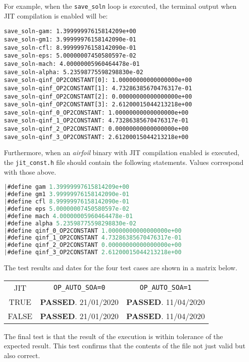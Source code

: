 \clearpage
\noindent For example, when the \verb|save_soln| loop is executed, the terminal output when JIT compilation is enabled will be:
\begin{lstlisting}[frame=none]
save_soln-gam: 1.39999997615814209e+00
save_soln-gm1: 3.99999976158142090e-01
save_soln-cfl: 8.99999976158142090e-01
save_soln-eps: 5.00000007450580597e-02
save_soln-mach: 4.00000005960464478e-01
save_soln-alpha: 5.23598775598298830e-02
save_soln-qinf_OP2CONSTANT[0]: 1.00000000000000000e+00
save_soln-qinf_OP2CONSTANT[1]: 4.73286385670476317e-01
save_soln-qinf_OP2CONSTANT[2]: 0.00000000000000000e+00
save_soln-qinf_OP2CONSTANT[3]: 2.61200015044213218e+00
save_soln-qinf_0_OP2CONSTANT: 1.00000000000000000e+00
save_soln-qinf_1_OP2CONSTANT: 4.73286385670476317e-01
save_soln-qinf_2_OP2CONSTANT: 0.00000000000000000e+00
save_soln-qinf_3_OP2CONSTANT: 2.61200015044213218e+00
\end{lstlisting}

\noindent Furthermore, when an \textit{airfoil} binary with JIT compilation enabled is executed, the \verb|jit_const.h| file should contain the following statements. Values correspond with those above.
\begin{lstlisting}[backgroundcolor=\color{green!20}, language=C]
|#define gam 1.39999997615814209e+00
|#define gm1 3.99999976158142090e-01
|#define cfl 8.99999976158142090e-01
|#define eps 5.00000007450580597e-02
|#define mach 4.00000005960464478e-01
|#define alpha 5.23598775598298830e-02
|#define qinf_0_OP2CONSTANT 1.00000000000000000e+00
|#define qinf_1_OP2CONSTANT 4.73286385670476317e-01
|#define qinf_2_OP2CONSTANT 0.00000000000000000e+00
|#define qinf_3_OP2CONSTANT 2.61200015044213218e+00
\end{lstlisting}
\vfill
\noindent The test results and dates for the four test cases are shown in a matrix below.
\begin{table}[h]
\centering
\renewcommand{\arraystretch}{1.5}
\begin{tabular}{| c || c | c |}
\hline
JIT & \verb|OP_AUTO_SOA=0| & \verb|OP_AUTO_SOA=1| \\
\hhline{|=|=|=|}
TRUE &\textbf{\textcolor{green!20!black}{PASSED}}. 21/01/2020 &\textbf{\textcolor{green!20!black}{PASSED}}. 11/04/2020 \\
\hline
FALSE&\textbf{\textcolor{green!20!black}{PASSED}}. 21/01/2020 &\textbf{\textcolor{green!20!black}{PASSED}}. 11/04/2020 \\
\hline
\end{tabular}
\end{table}
\clearpage
{}
The final test is that the result of the execution is within tolerance of the expected result. This test confirms that the contents of the file not just valid but also correct.

